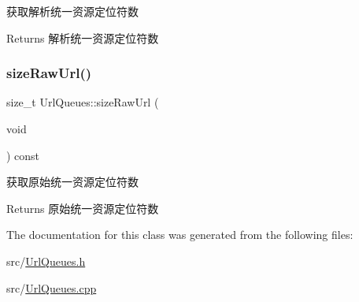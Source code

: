 获取解析统一资源定位符数 

\begin{DoxyReturn}{Returns}
解析统一资源定位符数 
\end{DoxyReturn}
\mbox{\label{class_url_queues_a713458484da28e9ada936ccc268413b3}} 
\subsubsection{\texorpdfstring{size\+Raw\+Url()}{sizeRawUrl()}}
{\footnotesize\ttfamily size\+\_\+t Url\+Queues\+::size\+Raw\+Url (\begin{DoxyParamCaption}\item[{void}]{ }\end{DoxyParamCaption}) const}



获取原始统一资源定位符数 

\begin{DoxyReturn}{Returns}
原始统一资源定位符数 
\end{DoxyReturn}


The documentation for this class was generated from the following files\+:\begin{DoxyCompactItemize}
\item 
src/\hyperlink{_url_queues_8h}{Url\+Queues.\+h}\item 
src/\hyperlink{_url_queues_8cpp}{Url\+Queues.\+cpp}\end{DoxyCompactItemize}
